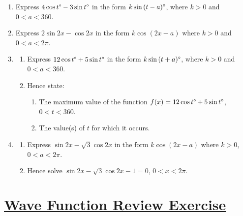 \documentclass[
  11pt,
  openany]{book}
\begin{document}
\vspace{-0.3cm}

\begin{enumerate}
    \item Express $4\cos{t}\degree-3\sin{t}\degree$ in the form $k\sin{(t-a)}\degree$, where $k>0$ and $0<a<360$. \faCalculator
    \item Express $2\sin{2x}-\cos{2x}$ in the form $k\cos{(2x-a)}$ where $k>0$ and $0<a<2\pi$. \faCalculator
    \item 
    \begin{enumerate}
        \item Express $12\cos{t}\degree+5\sin{t}\degree$ in the form $k\sin{(t+a)}\degree$, where $k>0$ and $0<a<360$. \faCalculator
        \item Hence state:
        \begin{enumerate}
            \item The maximum value of the function $f(x)=12\cos{t}\degree+5\sin{t}\degree$, $0<t<360$.
            \item The value(s) of $t$ for which it occurs.
        \end{enumerate}
    \end{enumerate}
    \item 
    \begin{enumerate}
        \item Express $\sin{2x}-\sqrt{3}\cos{2x}$ in the form $k\cos{(2x-a)}$ where $k>0$, $0<a<2\pi$.
        \item Hence solve $\sin{2x}-\sqrt{3}\cos{2x}-1=0$, $0<x<2\pi$.
    \end{enumerate}
\end{enumerate}

\pagebreak

\label{ex14Rq}{}

\section*{\texorpdfstring{\hyperref[ex14Ra]{Wave Function Review Exercise}}{Wave Function Review Exercise}}\label{wave-function-review-exercise}
\end{document}
